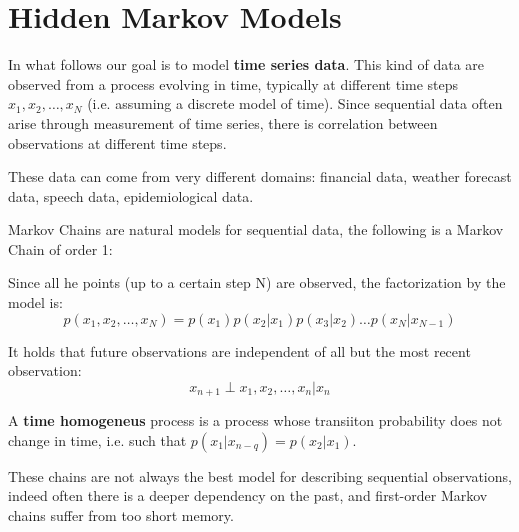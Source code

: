 
\chapter{Hidden Markov Models}

In what follows our goal is to model \textbf{time series data}. This kind of data are observed from a process evolving in time, typically at different time steps $x_1, x_2, \dots, x_N$ (i.e. assuming a discrete model of time). Since sequential data often arise through measurement of time series, there is correlation between observations at different time steps. 

These data can come from very different domains: financial data, weather forecast data, speech data, epidemiological data. 

Markov Chains are natural models for sequential data, the following is a Markov Chain of order 1:
\vspace{0.5cm}
\begin{center}
\end{center}
\vspace{0.5cm}
Since all he points (up to a certain step N) are observed, the factorization by the model is:
$$
p(x_1, x_2, \dots, x_N) = p(x_1) p(x_2 | x_1) p(x_3 | x_2) \dots p(x_N | x_{N-1})
$$

It holds that future observations are independent of all but the most recent observation:
$$
x_{n+1} \perp x_1, x_2, \dots, x_n | x_n
$$

A \textbf{time homogeneus} process is a process whose transiiton probability does not change in time, i.e. such that $p(x_1|x_{n-q}) = p(x_2|x_1)$.

These chains are not always the best model for describing sequential observations, indeed often there is a deeper dependency on the past, and first-order Markov chains suffer from too short memory. 

